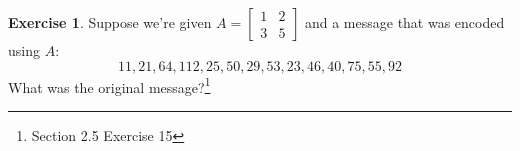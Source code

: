 \documentclass[handout]{beamer}
\newcommand{\fn}{\insertframenumber}
\theoremstyle{definition}
\newtheorem{exercise}{Exercise}
\begin{document}
\begin{frame}{\fn}
	\begin{exercise}
		Suppose we're given $A=\begin{bmatrix}1&2\\3&5\end{bmatrix}$ and a message that was encoded using $A$:
	\[11, 21, 64, 112, 25, 50, 29, 53, 23, 46, 40, 75, 55, 92\]
	What was the original message?\footnote{Section 2.5 Exercise 15}
	\end{exercise}
\end{frame}
%	
%	
%	
%	
\end{document}
